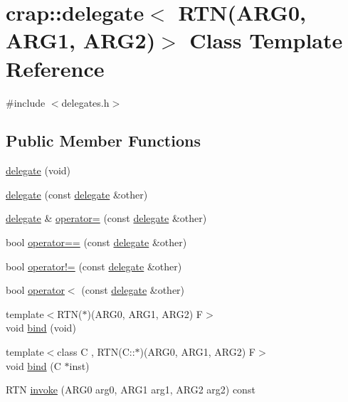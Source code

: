 \hypertarget{classcrap_1_1delegate_3_01_r_t_n_07_a_r_g0_00_01_a_r_g1_00_01_a_r_g2_08_4}{\section{crap\+:\+:delegate$<$ R\+T\+N(A\+R\+G0, A\+R\+G1, A\+R\+G2)$>$ Class Template Reference}
\label{classcrap_1_1delegate_3_01_r_t_n_07_a_r_g0_00_01_a_r_g1_00_01_a_r_g2_08_4}
}


{\ttfamily \#include $<$delegates.\+h$>$}

\subsection*{Public Member Functions}
\begin{DoxyCompactItemize}
\item 
\hyperlink{classcrap_1_1delegate_3_01_r_t_n_07_a_r_g0_00_01_a_r_g1_00_01_a_r_g2_08_4_ac62ac3b5ca29f3bc94a3fcd013450f2c}{delegate} (void)
\item 
\hyperlink{classcrap_1_1delegate_3_01_r_t_n_07_a_r_g0_00_01_a_r_g1_00_01_a_r_g2_08_4_a425299c29deebb1762186c82afa93442}{delegate} (const \hyperlink{classcrap_1_1delegate}{delegate} \&other)
\item 
\hyperlink{classcrap_1_1delegate}{delegate} \& \hyperlink{classcrap_1_1delegate_3_01_r_t_n_07_a_r_g0_00_01_a_r_g1_00_01_a_r_g2_08_4_a7f9f2572ab59915916a247d5209369a6}{operator=} (const \hyperlink{classcrap_1_1delegate}{delegate} \&other)
\item 
bool \hyperlink{classcrap_1_1delegate_3_01_r_t_n_07_a_r_g0_00_01_a_r_g1_00_01_a_r_g2_08_4_a2439b754039b4322887dc48accca9d7e}{operator==} (const \hyperlink{classcrap_1_1delegate}{delegate} \&other)
\item 
bool \hyperlink{classcrap_1_1delegate_3_01_r_t_n_07_a_r_g0_00_01_a_r_g1_00_01_a_r_g2_08_4_a1df778ac08547a61598feae6a10d7308}{operator!=} (const \hyperlink{classcrap_1_1delegate}{delegate} \&other)
\item 
bool \hyperlink{classcrap_1_1delegate_3_01_r_t_n_07_a_r_g0_00_01_a_r_g1_00_01_a_r_g2_08_4_a386142f661006a6f678f676db5161a50}{operator$<$} (const \hyperlink{classcrap_1_1delegate}{delegate} \&other)
\item 
{\footnotesize template$<$R\+T\+N($\ast$)(\+A\+R\+G0, A\+R\+G1, A\+R\+G2) F$>$ }\\void \hyperlink{classcrap_1_1delegate_3_01_r_t_n_07_a_r_g0_00_01_a_r_g1_00_01_a_r_g2_08_4_a0d4f9b69e65f06df191044633c938cfa}{bind} (void)
\item 
{\footnotesize template$<$class C , R\+T\+N(\+C\+::$\ast$)(\+A\+R\+G0, A\+R\+G1, A\+R\+G2) F$>$ }\\void \hyperlink{classcrap_1_1delegate_3_01_r_t_n_07_a_r_g0_00_01_a_r_g1_00_01_a_r_g2_08_4_a906bef28b1a84b40a15a4b3fe520f45f}{bind} (C $\ast$inst)
\item 
R\+T\+N \hyperlink{classcrap_1_1delegate_3_01_r_t_n_07_a_r_g0_00_01_a_r_g1_00_01_a_r_g2_08_4_ad7cfcf0f6cdb5c7b32b523fdb74db9b8}{invoke} (A\+R\+G0 arg0, A\+R\+G1 arg1, A\+R\+G2 arg2) const 
\end{DoxyCompactItemize}


